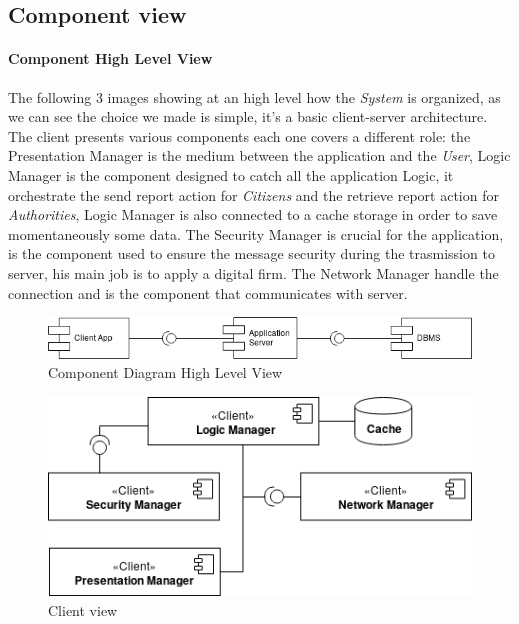 \documentclass{article}
\begin{document}
\clearpage
\subsection{Component view}

\paragraph{Component High Level View}
The following 3 images showing at an high level how the \textit{System} is organized, as we can see the
choice we made is simple, it's a basic client-server architecture. The client presents various components 
each one covers a different role: the Presentation Manager is the medium between the application and the
\textit{User}, Logic Manager is the component designed to catch all the application Logic, it orchestrate
the send report action for \textit{Citizens} and the retrieve report action for \textit{Authorities}, 
Logic Manager is also connected to a cache storage in order to save momentaneously some data. The
Security Manager is crucial for the application, is the component used to ensure the message security 
during the trasmission to server, his main job is to apply a digital firm. The Network Manager handle the
connection and is the component that communicates with server. 

\begin{figure}[H]
    \centering
    \includegraphics[scale=0.4]{img/component_diagrams/component_diagram.png}
    \caption{Component Diagram High Level View}
\end{figure}

\begin{figure}[H]
    \centering
    \includegraphics[scale=0.4]{img/component_diagrams/client_component.png}
    \caption{Client view}
\end{figure}
\end{document}
